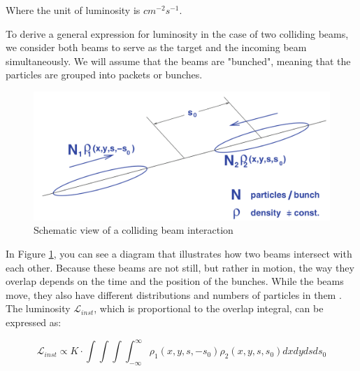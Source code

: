 Where the unit of luminosity is $cm^{-2}s^{-1}$. 

To derive a general expression for luminosity in the case of two colliding beams, we consider both beams to serve as the target and the incoming beam simultaneously. We will assume that the beams are "bunched", meaning that the particles are grouped into packets or bunches. 

\begin{center}
  \begin{figure}[h!]
    \centering
\includegraphics[scale=.25]{Chapter1/luminosity.png} 
 \caption[Colliding beam interaction]{Schematic view of a colliding beam interaction\cite{concept_of_luminosity}}
    \label{luminosity}
  \end{figure}
\end{center}

 In Figure \ref{luminosity}, you can see a diagram that illustrates how two beams intersect with each other. Because these beams are not still, but rather in motion, the way they overlap depends on the time and the position of the bunches. While the beams move, they also have different distributions and numbers of particles in them \cite{concept_of_luminosity}. The luminosity $\mathcal{L}_{inst}$, which is proportional to the overlap integral, can be expressed as: 
 
\begin{equation}
  \mathcal{L}_{inst}\propto K\cdot \int\int\int \int_{-\infty}^{\infty} \rho_{1}(x,y,s,-s_{0}) \rho_{2}(x,y,s,s_{0})dxdydsds_{0}
    \label{lumi_1}
\end{equation}
 
